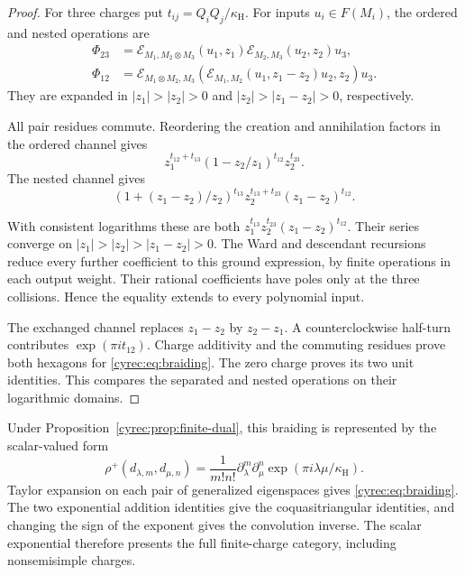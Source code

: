 \begin{proof}
For three charges put $t_{ij}=Q_iQ_j/\kappa_{\mathrm H}$.
For inputs $u_i\in F(M_i)$, the ordered and nested operations are
\begin{align*}
 \Phi_{23}&=\mathcal E_{M_1,M_2\otimes M_3}(u_1,z_1)
                          \mathcal E_{M_2,M_3}(u_2,z_2)u_3,\\
 \Phi_{12}&=\mathcal E_{M_1\otimes M_2,M_3}
             (\mathcal E_{M_1,M_2}(u_1,z_1-z_2)u_2,z_2)u_3.
\end{align*}
They are expanded in $|z_1|>|z_2|>0$ and
$|z_2|>|z_1-z_2|>0$, respectively.

All pair residues commute. Reordering the creation and
annihilation factors in the ordered channel gives
\[
 z_1^{t_{12}+t_{13}}(1-z_2/z_1)^{t_{12}}z_2^{t_{23}}.
\]
The nested channel gives
\[
 (1+(z_1-z_2)/z_2)^{t_{13}}
      z_2^{t_{13}+t_{23}}(z_1-z_2)^{t_{12}}.
\]

With consistent logarithms these are both
$z_1^{t_{13}}z_2^{t_{23}}(z_1-z_2)^{t_{12}}$.
Their series converge on $|z_1|>|z_2|>|z_1-z_2|>0$.
The Ward and descendant recursions reduce every further coefficient
to this ground expression, by finite operations in each output weight.
Their rational coefficients have poles only at the three collisions. Hence the equality extends to every polynomial input.

The exchanged channel replaces $z_1-z_2$ by $z_2-z_1$.
A counterclockwise half-turn contributes $\exp(\pi i t_{12})$.
Charge additivity and the commuting residues prove both hexagons
for \eqref{cyrec:eq:braiding}. The zero charge proves its two unit
identities. This compares the separated and nested operations on
their logarithmic domains.
\end{proof}

Under Proposition~\ref{cyrec:prop:finite-dual}, this braiding is
represented by the scalar-valued form
\begin{equation}\label{cyrec:eq:distribution-form}
 \rho^+(d_{\lambda,m},d_{\mu,n})
 =\frac{1}{m!n!}\partial_\lambda^m\partial_\mu^n
                  \exp(\pi i\lambda\mu/\kappa_{\mathrm H}).
\end{equation}
Taylor expansion on each pair of generalized eigenspaces gives
\eqref{cyrec:eq:braiding}. The two exponential addition identities
give the coquasitriangular identities, and changing the sign of the
exponent gives the convolution inverse. The scalar exponential
therefore presents the full finite-charge category, including
nonsemisimple charges.

